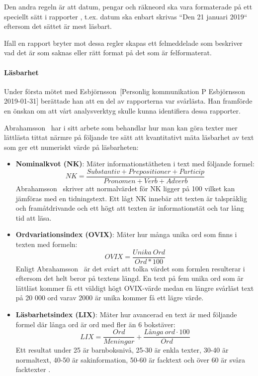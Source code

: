 \documentclass[swedish]{maucsthesis}
\begin{document}
Den andra regeln är att datum, pengar och räkneord ska vara formaterade på
ett speciellt sätt i rapporter \cite{rfsip}, t.ex. datum ska enbart 
skrivas ``Den 21 januari 2019`` eftersom det sättet är mest läsbart.

Ifall en rapport bryter mot dessa regler skapas ett felmeddelade som beskriver
vad det är som saknas eller rätt format på det som är felformaterat.

\paragraph*{Läsbarhet}\label{läsbarhet}

Under första mötet med Esbjörnsson~[Personlig kommunikation P Esbjörnsson 2019-01-31] berättade han att en del av
rapporterna var svårlästa. Han framförde en önskan om att vårt analysverktyg
skulle kunna identifiera dessa rapporter.

Abrahamsson~\cite{abrahamsson:2011} har i sitt arbete som behandlar hur man kan göra texter
mer lättlästa tittat närmre på följande tre sätt att kvantitativt mäta läsbarhet
av text som ger ett numeriskt värde på läsbarheten:

\begin{itemize}
\item \textbf{Nominalkvot (NK)}: Mäter informationstätheten i text med följande
  formel: $$NK=\frac{Substantiv + Prepositioner + Particip} {Pronomen + Verb + Adverb}$$
  Abrahamsson~\cite{abrahamsson:2011} skriver att normalvärdet för NK ligger på 100 vilket
  kan jämföras med en tidningstext. Ett lågt NK innebär att texten är
  talspråklig och framåtdrivande och ett högt att texten är informationstät och
  tar lång tid att läsa.
\item \textbf{Ordvariationsindex (OVIX)}: Mäter hur många unika ord som finns i
  texten med formeln: $$OVIX=\frac{Unika~Ord} {Ord *100}$$
  Enligt Abrahamsson~\cite{abrahamsson:2011} är
  det svårt att tolka värdet som formlen resulterar i eftersom det helt beror på
  textens längd. En text på fem unika ord som är lättläst kommer få ett väldigt
  högt OVIX-värde medan en längre svårläst text på 20 000 ord varav 2000 är
  unika kommer få ett lägre värde.
\item \textbf{Läsbarhetsindex (LIX)}: Mäter hur avancerad en text är med
  följande formel där långa ord är ord med fler än 6 bokstäver: 
  $$LIX=\frac{Ord}{Meningar} + \frac{L\text{å}nga~ord \cdot 100}{Ord}$$
  Ett resultat under 25 är barnboksnivå, 25-30 är
  enkla texter, 30-40 är normaltext, 40-50 är sakinformation, 50-60 är facktext
  och över 60 är svåra facktexter \cite{abrahamsson:2011}.
\end{itemize}
\end{document}
